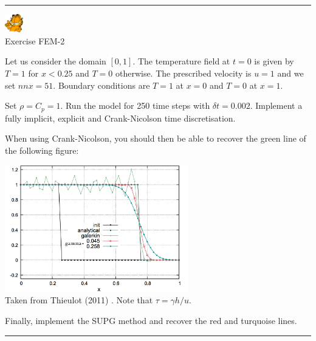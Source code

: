 \begin{center}
\begin{minipage}[t]{0.77\textwidth}
\par\noindent\rule{\textwidth}{0.4pt}

\begin{center}
\includegraphics[width=0.8cm]{images/garftr} \\
{\color{orange}Exercise FEM-2}
\end{center}

Let us consider the domain $[0,1]$. The temperature field at $t=0$ is 
given by $T=1$ for $x<0.25$ and $T=0$ otherwise. The prescribed 
velocity is $u=1$ and we set $nnx=51$.
Boundary conditions are $T=1$ at $x=0$ and $T=0$ at $x=1$.

\begin{center}

\end{center}

Set $\rho=C_p=1$.
Run the model for 250 time steps with $\delta t=0.002$.
Implement a fully implicit, explicit and Crank-Nicolson 
time discretisation. 

When using Crank-Nicolson, you should then be able to recover the green line of the 
following figure:
\begin{center}
\includegraphics[width=8cm]{images/fem_exercises/fantom3.png} \\
{\captionfont Taken from Thieulot (2011) \cite{thie11}. Note that $\tau=\gamma h/u$.}
\end{center}

Finally, implement the SUPG method and recover the red and turquoise lines.

\par\noindent\rule{\textwidth}{0.4pt}
\end{minipage}
\end{center}











